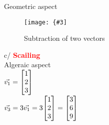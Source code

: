\documentclass[12pt,a4paper]{article}
\newcommand{\img}[3]{
	\texttt{[image: \{\#3]}}}
\newcommand{\red}[1]{\textcolor{red}{\textbf{#1}}}
\begin{document}
\noindent Geometric aspect\\
\begin{figure}[h!]
\centering\img{6cm}{4cm}{Picture/Linear_algebra/Vector_and_basic_ops/2.png}
\caption{Subtraction of two vectors}
\end{figure}

\noindent c/ \red{Scailing}\\
Algeraic aspect\\
$\vec{v_1}=\mqty[1\\ 2\\ 3]$\\
$\vec{v_3}=3\vec{v_1}=3\mqty[1\\ 2\\ 3]=\mqty[3\\ 6\\ 9]$\\
\end{document}
